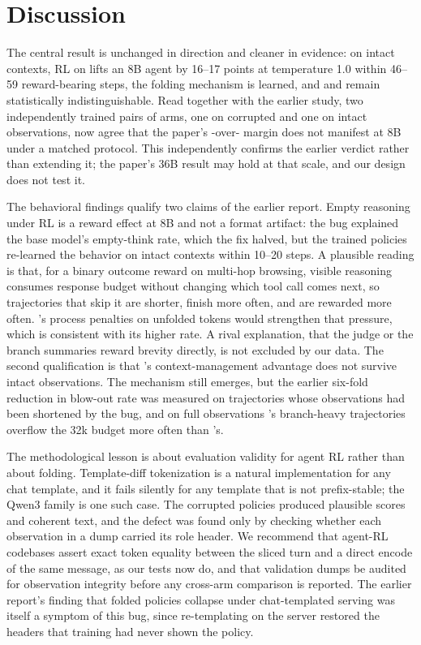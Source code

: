 \section{Discussion}
\label{sec:discussion}

The central result is unchanged in direction and cleaner in evidence: on intact contexts, RL on
\bcplus{} lifts an 8B agent by 16--17 points at temperature 1.0 within 46--59 reward-bearing
steps, the folding mechanism is learned, and \foldgrpo{} and \grpo{} remain statistically
indistinguishable. Read together with the earlier study, two independently trained pairs of
arms, one on corrupted and one on intact observations, now agree that the paper's
\foldgrpo{}-over-\grpo{} margin does not manifest at 8B under a matched protocol. This
independently confirms the earlier verdict rather than extending it; the paper's 36B result
may hold at that scale, and our design does not test it.

The behavioral findings qualify two claims of the earlier report. Empty reasoning under RL is
a reward effect at 8B and not a format artifact: the bug explained the base model's empty-think
rate, which the fix halved, but the trained policies re-learned the behavior on intact
contexts within 10--20 steps. A plausible reading is that, for a binary outcome reward on
multi-hop browsing, visible reasoning consumes response budget without changing which tool
call comes next, so trajectories that skip it are shorter, finish more often, and are rewarded
more often. \foldgrpo{}'s process penalties on unfolded tokens would strengthen that pressure,
which is consistent with its higher rate. A rival explanation, that the judge or the branch
summaries reward brevity directly, is not excluded by our data. The second qualification is
that \foldgrpo{}'s context-management advantage does not survive intact observations. The
mechanism still emerges, but the earlier six-fold reduction in blow-out rate was measured on
trajectories whose observations had been shortened by the bug, and on full observations
\foldgrpo{}'s branch-heavy trajectories overflow the 32k budget more often than \grpo{}'s.

The methodological lesson is about evaluation validity for agent RL rather than about folding.
Template-diff tokenization is a natural implementation for any chat template, and it fails
silently for any template that is not prefix-stable; the Qwen3 family is one such case. The
corrupted policies produced plausible scores and coherent text, and the defect was found only
by checking whether each observation in a dump carried its role header. We recommend that
agent-RL codebases assert exact token equality between the sliced turn and a direct encode of
the same message, as our tests now do, and that validation dumps be audited for observation
integrity before any cross-arm comparison is reported. The earlier report's finding that folded
policies collapse under chat-templated serving was itself a symptom of this bug, since
re-templating on the server restored the headers that training had never shown the policy.

